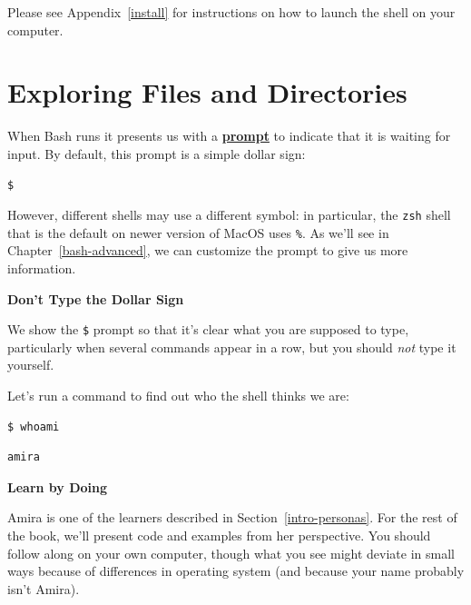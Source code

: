 \documentclass[
]{krantz}
\renewenvironment{quote}{\begin{VF}}{\end{VF}}
\newcommand{\gref}[2]{\hyperlink{#2}{\textbf{#1}}}
\begin{document}
Please see Appendix~\ref{install} for instructions
on how to launch the shell on your computer.

\hypertarget{bash-basics-explore}{%
\section{Exploring Files and Directories}\label{bash-basics-explore}}

When Bash runs it presents us with a \gref{prompt}{prompt} to indicate that it is waiting for input.
By default,
this prompt is a simple dollar sign:

\begin{verbatim}
$
\end{verbatim}

However,
different shells may use a different symbol:
in particular,
the \texttt{zsh} shell that is the default on newer version of MacOS uses \texttt{\%}.
As we'll see in Chapter~\ref{bash-advanced},
we can customize the prompt to give us more information.

\begin{quote}
\textbf{Don't Type the Dollar Sign}

We show the \texttt{\$} prompt so that it's clear what you are supposed to type,
particularly when several commands appear in a row,
but you should \emph{not} type it yourself.
\end{quote}

Let's run a command to find out who the shell thinks we are:

\begin{verbatim}
$ whoami
\end{verbatim}

\begin{verbatim}
amira
\end{verbatim}

\begin{quote}
\textbf{Learn by Doing}

Amira is one of the learners described in Section~\ref{intro-personas}.
For the rest of the book,
we'll present code and examples from her perspective.
You should follow along on your own computer,
though what you see might deviate in small ways because of differences in operating system
(and because your name probably isn't Amira).
\end{quote}
\end{document}
